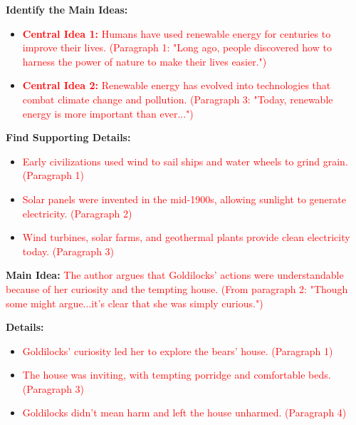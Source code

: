 \documentclass[12pt]{article}
\begin{document}
\vspace{2em}

\begin{tcolorbox}[colframe=black!60, colback=white, 
coltitle=black, colbacktitle=black!15, fonttitle=\bfseries\Large, 
title=Guided Practice, halign title=center, left=10pt, right=10pt, bottom=15pt]

\textbf{Identify the Main Ideas:}
\begin{itemize}
    \item \textcolor{red}{\textbf{Central Idea 1:} Humans have used renewable energy for centuries to improve their lives. (Paragraph 1: "Long ago, people discovered how to harness the power of nature to make their lives easier.")}  
    \item \textcolor{red}{\textbf{Central Idea 2:} Renewable energy has evolved into technologies that combat climate change and pollution. (Paragraph 3: "Today, renewable energy is more important than ever...")}  
\end{itemize}

\textbf{Find Supporting Details:}
\begin{itemize}
    \item \textcolor{red}{Early civilizations used wind to sail ships and water wheels to grind grain. (Paragraph 1)}  
    \item \textcolor{red}{Solar panels were invented in the mid-1900s, allowing sunlight to generate electricity. (Paragraph 2)}  
    \item \textcolor{red}{Wind turbines, solar farms, and geothermal plants provide clean electricity today. (Paragraph 3)}  
\end{itemize}

\end{tcolorbox}

\vspace{2em}

\begin{tcolorbox}[colframe=black!60, colback=white, 
coltitle=black, colbacktitle=black!15, fonttitle=\bfseries\Large, 
title=Independent Practice, halign title=center, left=10pt, right=10pt, bottom=15pt]

\textbf{Main Idea:} \textcolor{red}{The author argues that Goldilocks' actions were understandable because of her curiosity and the tempting house. (From paragraph 2: "Though some might argue...it’s clear that she was simply curious.")}  

\textbf{Details:}
\begin{itemize}
    \item \textcolor{red}{Goldilocks’ curiosity led her to explore the bears’ house. (Paragraph 1)}  
    \item \textcolor{red}{The house was inviting, with tempting porridge and comfortable beds. (Paragraph 3)}  
    \item \textcolor{red}{Goldilocks didn’t mean harm and left the house unharmed. (Paragraph 4)}  
\end{itemize}
\end{tcolorbox}
\end{document}
